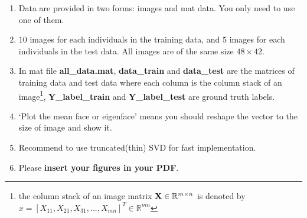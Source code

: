 \documentclass[english,onecolumn]{IEEEtran}
\newcommand{\Rbb}{\mathbb{R}}
\newcommand{\bX}{{\bf X}}
\begin{document}
\begin{enumerate}
    \item Data are provided in two forms: images and mat data. You only need to use one of them. 
    \item $10$ images for each individuals in the training data, and $5$ images for each individuals in the test data. All images are of the same size $48\times 42$.
    \item In mat file \textbf{all\_data.mat}, \textbf{data\_train} and \textbf{data\_test} are the matrices of training data and test data where each column is the column stack of an image\footnote{the column stack of an image matrix $\bX\in \Rbb^{m\times n}$ is denoted by $x = [X_{11},X_{21},X_{31},...,X_{mn}]^T\in\Rbb^{mn}$}, \textbf{Y\_label\_train} and \textbf{Y\_label\_test} are ground truth labels.
    \item `Plot the mean face or eigenface' means you should reshape the vector to the size of image and show it.
    \item Recommend to use truncated(thin) SVD for fast implementation.
    \item Please \textbf{insert your figures in your PDF}.
\end{enumerate}
\end{document}
